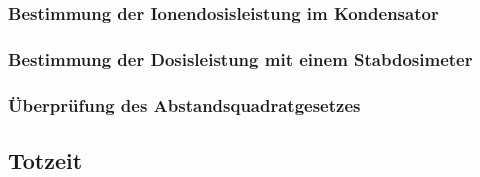 \documentclass[11pt, a4paper]{article}
\numberwithin{equation}{section}
\begin{document}
\subsubsection{Bestimmung der Ionendosisleistung im Kondensator}

\subsubsection{Bestimmung der Dosisleistung mit einem Stabdosimeter}

\subsubsection{Überprüfung des Abstandsquadratgesetzes}


\subsection{Totzeit}
\end{document}
